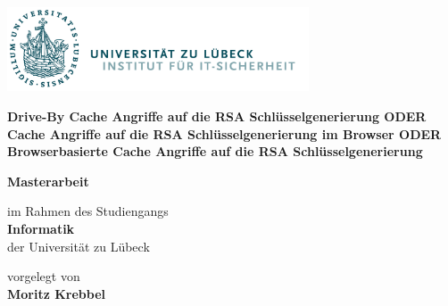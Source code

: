 \begin{titlepage}

{

\vspace*{1cm}

\includegraphics[height=2.5cm]{pictures/its-logo.png}

\vspace*{2.5cm}


\textbf{\LARGE{Drive-By Cache Angriffe auf die RSA Schlüsselgenerierung ODER
Cache Angriffe auf die RSA Schlüsselgenerierung im Browser ODER
Browserbasierte Cache Angriffe auf die RSA Schlüsselgenerierung}} \vspace*{1em} \\
\textit{\LARGE{}}

\vspace*{2em}

\textbf{Masterarbeit}

\vspace*{1em}

im Rahmen des Studiengangs \\ %
\textbf{Informatik} \\ %
der Universität zu Lübeck %

\vspace*{1.5em}

vorgelegt von \\ %
\textbf{Moritz Krebbel}

}
\end{titlepage}
